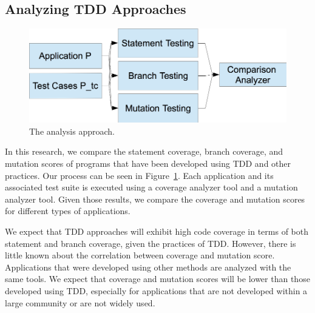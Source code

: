 \documentclass[conference]{IEEEtran}
\begin{document}

\subsection{Analyzing TDD Approaches}
\begin{figure}[t!]
\centering
\includegraphics[scale=.4]{the_process.png}
\caption{The analysis approach.}
\label{fig:process}
\end{figure}
In this research, we compare the statement coverage, branch coverage, and mutation scores of programs that have been developed using TDD and other practices.  Our process can be seen in Figure~\ref{fig:process}.  Each application and its associated test suite is executed using a coverage analyzer tool and a mutation analyzer tool.  Given those results, we compare the coverage and mutation scores for different types of applications.

We expect that TDD approaches will exhibit high code coverage in terms of both statement and branch coverage, given the practices of TDD.  However, there is little known about the correlation between coverage and mutation score.  Applications that were developed using other methods are analyzed with the same tools.  We expect that coverage and mutation scores will be lower than those developed using TDD, especially for applications that are not developed within a large community or are not widely used.  
\end{document}
